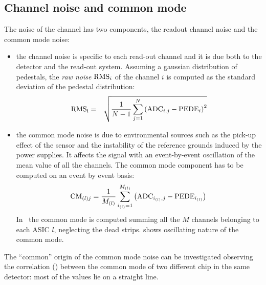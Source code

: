\subsection{Channel noise and common mode}
The noise of the channel has two components, the readout channel noise and
the common mode noise:
\begin{itemize}
\item the channel noise is specific to each read-out channel and it is
due both to the detector and the read-out system. Assuming
a gaussian distribution of pedestals, the {\it raw noise} ${\rm RMS}_i$ of the channel $i$ is
computed as the standard deviation of the pedestal distribution:
\begin{eqnarray}\label{eq:rms}
{\rm RMS}_{\rm i} &=& \sqrt{\frac{1}{N-1}\sum_{j=1}^N \left({\rm ADC}_{i,j} - {\rm
                      PEDE}_{i}\right)^2}
\end{eqnarray}

\item the common mode noise is due to environmental sources such as the pick-up
  effect of the sensor and the instability of the reference grounds induced by
  the power supplies. It affects the signal with an event-by-event oscillation
  of the mean value of all the channels. The common mode
  component has to be computed on an event by event basis:
  \begin{equation}\label{eq:cm}
    {\rm CM}_{(l)j} = \frac{1}{M_{(l)}}\sum_{i_{(l)}=1}^{M_{(l)}} \left({\rm ADC}_{i_{(l)},j} - {\rm PEDE}_{i_{(l)}}\right) \\
  \end{equation}
  In~ the common mode is computed summing all the $M$ channels
  belonging to each ASIC $l$, neglecting the dead strips. 
  shows oscillating nature of the common mode.
\end{itemize}
The ``common'' origin of the common mode noise can be investigated observing the
correlation () between the common mode of two different
chip in the same detector: most of the values lie on a straight line.\\
